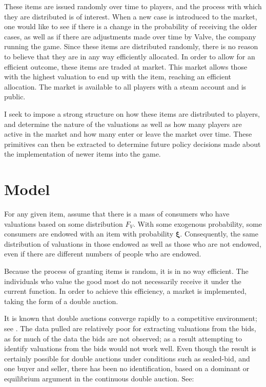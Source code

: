 \documentclass[12pt, letterpaper]{paper}
\begin{document}
These items are issued randomly over time to players, and the process
with which they are distributed is of interest. When a new case is
introduced to the market, one would like to see if there is a
change in the probability of receiving the older cases, as well as if
there are adjustments made over time by Valve, the company running the
game. Since these items are distributed randomly, there is no reason to
believe that they are in any way efficiently allocated. In order to
allow for an efficient outcome, these items are traded at
market. This market allows those with the highest valuation to end up
with the item, reaching an efficient allocation. The market is
available to all players with a steam account and is public. 

I seek to impose a strong structure on how these items are distributed
to players, and determine the nature of the valuations as well as how
many players are active in the market and how many enter or leave the
market over time. These primitives can then be extracted to determine
future policy decisions made about the implementation of newer items
into the game. 

\section{Model}
\label{sec-2}

For any given item, assume that there is a mass of consumers who have
valuations based on some distribution $F_V$. With some exogenous
probability, some consumers are endowed with an item with probability
$\bm{\xi}$. Consequently, the same distribution of valuations in those
endowed as well as those who are not endowed, even if there are
different numbers of people who are endowed. 

Because the process of granting items is random, it is in no way
efficient. The individuals who value the good most do not necessarily
receive it under the current function. In order to achieve this
efficiency, a market is implemented, taking the form of a double
auction.

It is known that double auctions  converge rapidly to a competitive
environment; see \cite{Efficiency}. The data pulled are relatively poor for extracting
valuations from the bids, as for much of the data the bids are not
observed; as a result attempting to identify valuations from the bids
would not work well. Even though the result is certainly possible for
double auctions under conditions such as sealed-bid, and one buyer and
seller, there has been no identification, based on a dominant or
equilibrium argument in the continuous double auction. See: \citet*{DoubleAuc} 
\end{document}
